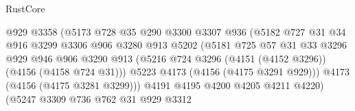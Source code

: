 \begin{lexlean}{RustCore}
\begin{coremodule}
                                      @929
                                      @3358
                                      (@5173
                                        @728
                                        @35
                                        @290
                                        @3300
                                        @3307
                                        @936
                                        (@5182
                                          @727
                                          @31
                                          @34
                                          @916
                                          @3299
                                          @3306
                                          @906
                                          @3280
                                          @913
                                          @5202
                                          (@5181
                                            @725
                                            @57
                                            @31
                                            @33
                                            @3296
                                            @929
                                            @946
                                            @906
                                            @3290
                                            @913
                                            (@5216
                                              @724
                                              @3296
                                              (@4151 (@4152 @3296))
                                              (@4156 (@4158 @724 @31)))
                                            @5223
                                            @4173
                                            (@4156 (@4175 @3291 @929)))
                                          @4173
                                          (@4156 (@4175 @3281 @3299)))
                                        @4191
                                        @4195
                                        @4200
                                        @4205
                                        @4211
                                        @4220)
                                      (@5247
                                        @3309
                                        @736
                                        @762
                                        @31
                                        @929
                                        @3312

\end{coremodule}
\end{lexlean}
